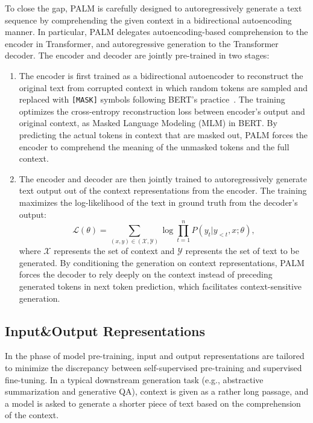 \documentclass[11pt,a4paper]{article}
\newcommand{\method}{PALM\xspace}
\begin{document}
To close the gap, \method is carefully designed to autoregressively generate a text sequence by comprehending the given context in a bidirectional autoencoding manner. In particular, \method delegates autoencoding-based comprehension to the encoder in Transformer, and autoregressive generation to the Transformer decoder. The encoder and decoder are jointly pre-trained in two stages:
\begin{enumerate}
    \item The encoder is first trained as a bidirectional autoencoder to reconstruct the original text from corrupted context in which random tokens are sampled and replaced with \texttt{[MASK]} symbols following BERT's practice~\cite{bert2018jacob}. The training optimizes the cross-entropy reconstruction loss between encoder's output and original context, as Masked Language Modeling (MLM) in BERT. By predicting the actual tokens in context that are masked out, \method forces the encoder to comprehend the meaning of the unmasked tokens and the full context.
    \item The encoder and decoder are then jointly trained to autoregressively generate text output out of the context representations from the encoder. The training maximizes the log-likelihood of the text in ground truth from the decoder's output:
    \begin{equation}
        \mathcal{L}(\theta)=\sum_{(x,y)\in (\mathcal{X},\mathcal{Y})}\log \prod_{t=1}^n P(y_t|y_{<t},x;\theta),
    \end{equation}
    where $\mathcal{X}$ represents the set of context and $\mathcal{Y}$ represents the set of text to be generated. By conditioning the generation on context representations, \method forces the decoder to rely deeply on the context instead of preceding generated tokens in next token prediction, which facilitates context-sensitive generation.
\end{enumerate}

\subsection{Input\&Output Representations}
\label{sec:in-out}
In the phase of model pre-training, input and output representations are tailored to minimize the discrepancy between self-supervised pre-training and supervised fine-tuning. In a typical downstream generation task (e.g., abstractive summarization and generative QA), context is given as a rather long passage, and a model is asked to generate a shorter piece of text based on the comprehension of the context.
\end{document}

